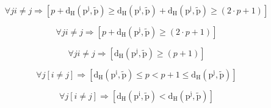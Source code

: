 \begin{enumerate}
\begin{enumerate}
\begin{enumerate}
\begin{enumerate}
        \[\forall j{i \neq j}\Rightarrow\left\lbrack {{p + \mathtt{\mathrm{d_{H}}}}{\left( {\mathtt{\mathrm{p^{j}}},\mathtt{\mathrm{\widetilde{p}}}} \right) \geq \mathtt{\mathrm{d_{H}}}}{\left( {\mathtt{\mathrm{p^{i}}},\mathtt{\mathrm{\widetilde{p}}}} \right) + \mathtt{\mathrm{d_{H}}}}{\left( {\mathtt{\mathrm{p^{j}}},\mathtt{\mathrm{\widetilde{p}}}} \right) \geq \left( {{2 \cdot p} + 1} \right)}} \right\rbrack\]

        \[\forall j{i \neq j}\Rightarrow\left\lbrack {{p + \mathtt{\mathrm{d_{H}}}}{\left( {\mathtt{\mathrm{p^{j}}},\mathtt{\mathrm{\widetilde{p}}}} \right) \geq \left( {{2 \cdot p} + 1} \right)}} \right\rbrack\]

        \[\forall j{i \neq j}\Rightarrow\left\lbrack {\mathtt{\mathrm{d_{H}}}{\left( {\mathtt{\mathrm{p^{j}}},\mathtt{\mathrm{\widetilde{p}}}} \right) \geq \left( {p + 1} \right)}} \right\rbrack\]

        \[\forall j\left\lbrack {i \neq j} \right\rbrack\Rightarrow\left\lbrack {\mathtt{\mathrm{d_{H}}}{{{\left( {\mathtt{\mathrm{p^{i}}},\mathtt{\mathrm{\widetilde{p}}}} \right) \leq p} < {p + 1}} \leq \mathtt{\mathrm{d_{H}}}}\left( {\mathtt{\mathrm{p^{j}}},\mathtt{\mathrm{\widetilde{p}}}} \right)} \right\rbrack\]

        \[\forall j\left\lbrack {i \neq j} \right\rbrack\Rightarrow\left\lbrack {\mathtt{\mathrm{d_{H}}}{\left( {\mathtt{\mathrm{p^{i}}},\mathtt{\mathrm{\widetilde{p}}}} \right) < \mathtt{\mathrm{d_{H}}}}\left( {\mathtt{\mathrm{p^{j}}},\mathtt{\mathrm{\widetilde{p}}}} \right)} \right\rbrack\]


\end{enumerate}
\end{enumerate}
\end{enumerate}
\end{enumerate}

